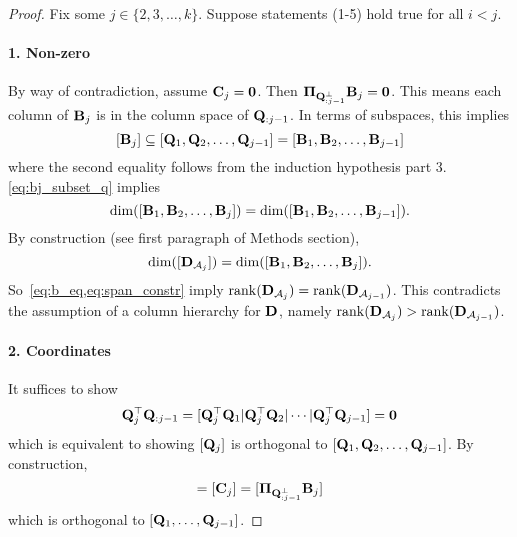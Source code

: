 \begin{proof}
    Fix some $j \in \{2,3,\dots,k\}$. Suppose statements (1-5) hold true for all $i < j$.

    \paragraph{1. Non-zero} By way of contradiction, assume $\mathbf{C}_j = \bm{0}$. Then $\boldsymbol{\Pi}_{\mathbf{Q}_{:j-1}^\perp}\mathbf{B}_j=\bm{0}$. This means each column of $\mathbf{B}_j$ is in the column space of $\mathbf{Q}_{:j-1}$. In terms of subspaces, this implies
    \begin{equation}\label{eq:bj_subset_q}
        [\mathbf{B}_j] \subseteq [\mathbf{Q}_1,\mathbf{Q}_2,\dots,\mathbf{Q}_{j-1}] = [\mathbf{B}_1,\mathbf{B}_2,\dots,\mathbf{B}_{j-1}]
    \end{equation}
    where the second equality follows from the induction hypothesis part 3. \cref{eq:bj_subset_q} implies 
    \begin{equation}\label{eq:b_eq}
        \mathrm{dim}([\mathbf{B}_1,\mathbf{B}_2,\dots,\mathbf{B}_j])
       = \mathrm{dim}([\mathbf{B}_1,\mathbf{B}_2,\dots,\mathbf{B}_{j-1}]).
    \end{equation}
    By construction (see first paragraph of Methods section), 
    \begin{equation}\label{eq:span_constr}
        \mathrm{dim}([\mathbf{D}_{\mathcal{A}_j}]) = \mathrm{dim}([\mathbf{B}_1,\mathbf{B}_2,\dots,\mathbf{B}_j]).
    \end{equation}
    So~\cref{eq:b_eq,eq:span_constr} imply $\mathrm{rank}(\mathbf{D}_{\mathcal{A}_j}) = \mathrm{rank}(\mathbf{D}_{\mathcal{A}_{j-1}})$. This contradicts the assumption of a column hierarchy for $\mathbf{D}$, namely $\mathrm{rank}(\mathbf{D}_{\mathcal{A}_j}) > \mathrm{rank}(\mathbf{D}_{\mathcal{A}_{j-1}})$.

    \paragraph{2. Coordinates} It suffices to show 
    \begin{equation}
        \mathbf{Q}_j^\top\mathbf{Q}_{:j-1} = [\mathbf{Q}_j^\top \mathbf{Q}_1| \mathbf{Q}_j^\top \mathbf{Q}_2| \cdots | \mathbf{Q}_j^\top \mathbf{Q}_{j-1}] = \bm{0}
    \end{equation} 
    which is equivalent to showing $[\mathbf{Q}_j]$ is orthogonal to $[\mathbf{Q}_1,\mathbf{Q}_2,\dots,\mathbf{Q}_{j-1}]$. By construction, 
    \begin{equation}
        [\Q_j] = [\C_j] = [\boldsymbol{\Pi}_{\Q_{:j-1}^\perp}\B_j]
    \end{equation} 
    which is orthogonal to $[\mathbf{Q}_1,\dots,\mathbf{Q}_{j-1}]$.


\end{proof}
